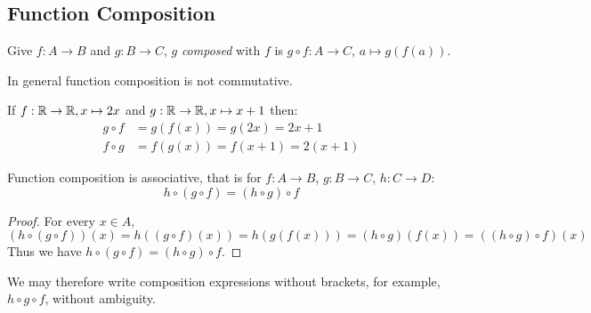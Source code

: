 \documentclass[../main.tex]{subfiles}
\begin{document}
\subsection{Function Composition}
\begin{definition}
  Give $f: A \to B$ and $g: B \to C$, $g$ \textit{composed} with $f$ is $g \circ f: A \to C$, $a \mapsto g(f(a))$.
\end{definition}
\begin{remark}[Warning]
  In general function composition is not commutative.
\end{remark}
\begin{example}
  If $f: \mathbb{R} \to \mathbb{R}, x \mapsto 2x$ and $g: \mathbb{R} \to \mathbb{R}, x \mapsto x + 1$ then:
  \begin{align*}
    g \circ f &= g(f(x)) = g(2x) = 2x + 1 \\
    f \circ g &= f(g(x)) = f(x + 1) = 2(x+1)
  \end{align*}
\end{example}
\begin{proposition}
Function composition is associative, that is for $f: A \to B$, $g: B \to C$, $h: C \to D$:
\[
  h \circ (g \circ f) = (h \circ g) \circ f
\]
\end{proposition}
\begin{proof}
  For every $x \in A$,
  \[
    (h \circ (g \circ f))(x) = h((g \circ f)(x)) = h(g(f(x))) = (h \circ g)(f(x)) = ((h \circ g) \circ f)(x)
  \]
  Thus we have $h \circ (g \circ f) = (h \circ g) \circ f$.
\end{proof}
We may therefore write composition expressions without brackets, for example, $h \circ g \circ f$, without ambiguity.
\end{document}
